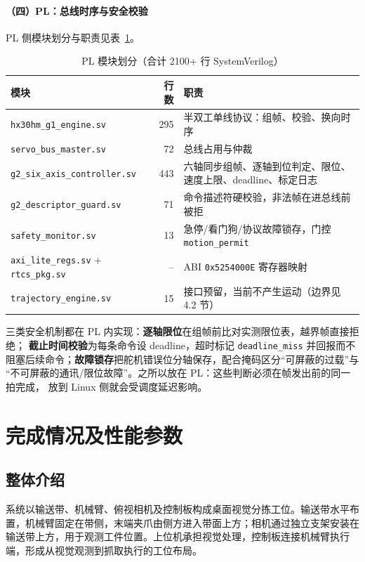 \documentclass[UTF8,a4paper,zihao=5,fontset=windows]{ctexart}
\newcommand{\code}[1]{\texttt{\small #1}}
\begin{document}
\paragraph{（四）PL：总线时序与安全校验}

PL 侧模块划分与职责见表~\ref{tab:pl}。

\begin{table}[H]\centering\small
\caption{PL 模块划分（合计 2100+ 行 SystemVerilog）}
\label{tab:pl}
\begin{tabular}{@{}p{5.1cm}rp{4.9cm}@{}}
\toprule
模块 & 行数 & 职责 \\
\midrule
\code{hx30hm\_g1\_engine.sv} & 295 & 半双工单线协议：组帧、校验、换向时序 \\
\code{servo\_bus\_master.sv} & 72 & 总线占用与仲裁 \\
\code{g2\_six\_axis\_controller.sv} & 443 & 六轴同步组帧、逐轴到位判定、限位、速度上限、deadline、标定日志 \\
\code{g2\_descriptor\_guard.sv} & 71 & 命令描述符硬校验，非法帧在进总线前被拒 \\
\code{safety\_monitor.sv} & 13 & 急停/看门狗/协议故障锁存，门控 \code{motion\_permit} \\
\code{axi\_lite\_regs.sv} + \code{rtcs\_pkg.sv} & -- & ABI \code{0x5254000E} 寄存器映射 \\
\code{trajectory\_engine.sv} & 15 & 接口预留，当前不产生运动（边界见 4.2 节） \\
\bottomrule
\end{tabular}
\end{table}

三类安全机制都在 PL 内实现：\textbf{逐轴限位}在组帧前比对实测限位表，越界帧直接拒绝；
\textbf{截止时间校验}为每条命令设 deadline，超时标记 \code{deadline\_miss} 并回报而不
阻塞后续命令；\textbf{故障锁存}把舵机错误位分轴保存，配合掩码区分“可屏蔽的过载”与
“不可屏蔽的通讯/限位故障”。之所以放在 PL：这些判断必须在帧发出前的同一拍完成，
放到 Linux 侧就会受调度延迟影响。

\section{完成情况及性能参数}

\subsection{整体介绍}
系统以输送带、机械臂、俯视相机及控制板构成桌面视觉分拣工位。输送带水平布置，机械臂固定在带侧，末端夹爪由侧方进入带面上方；相机通过独立支架安装在输送带上方，用于观测工件位置。上位机承担视觉处理，控制板连接机械臂执行端，形成从视觉观测到抓取执行的工位布局。
\end{document}
